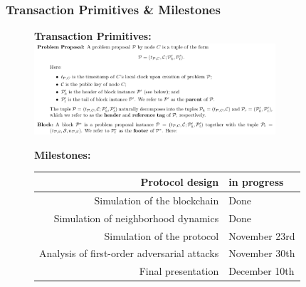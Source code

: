 \documentclass{beamer}
\begin{document}
\begin{frame}
	\frametitle{Transaction Primitives \& Milestones}
	\begin{figure}
		\centering
		\textbf{Transaction Primitives:} \\
		\vspace{5mm}
		\includegraphics[width=0.8\textwidth]{decker_figures/tentative_fig.png}

		\textbf{Milestones:} \\
		\vspace{3mm}
		\begin{tabular}{|r|l|}
			\hline
			Protocol design & in progress \\
			\hline
			Simulation of the blockchain & Done \\
			\hline
			Simulation of neighborhood dynamics & Done \\
			\hline
			Simulation of the protocol & November 23rd \\ %
			\hline
			Analysis of first-order adversarial attacks & November 30th \\
			\hline
			Final presentation & December 10th \\
			\hline
		\end{tabular}
	\end{figure}
\end{frame}
\end{document}

